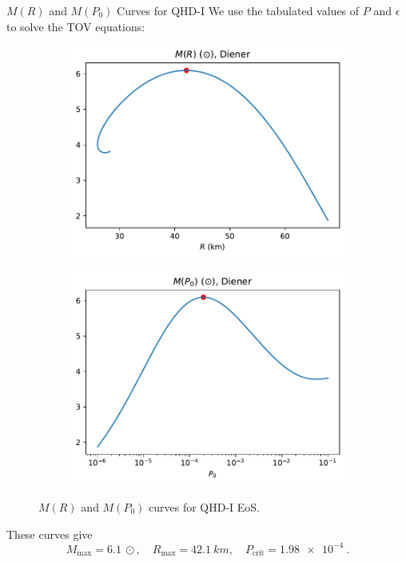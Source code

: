 \documentclass[]{beamer}
\begin{document}
    \begin{frame}{$M(R)$ and $M(P_0)$ Curves for QHD-I}
        We use the tabulated values of $P$ and $\epsilon$ to solve the TOV equations: \pause
        \begin{figure}[h!]
            \centering
            \begin{subfigure}{.5\textwidth}
                \includegraphics[width = \textwidth]{../paper/images/qhd1/r_analysis.pdf}
            \end{subfigure}%
            \begin{subfigure}{.5\textwidth}
                \includegraphics[width = \textwidth]{../paper/images/qhd1/p0_analysis.pdf}
            \end{subfigure}
            \caption[]{$M(R)$ and $M(P_0)$ curves for QHD-I EoS.}
        \end{figure}\pause
        \vspace{-3pt}
        These curves give \[M_\text{max} = \SI{6.1}{\odot}, \quad R_\text{max} = \SI{42.1}{km}, \quad P_\text{crit} = \SI{1.98e-4}{}.\]
    \end{frame}
\end{document}
